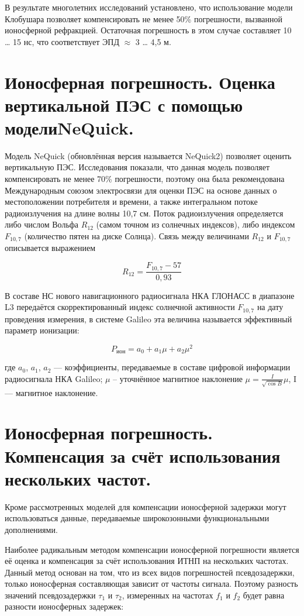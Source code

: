 \documentclass[14pt,a4paper,oneside]{extarticle}
\begin{document}
В результате многолетних исследований установлено, что использование модели Клобушара позволяет компенсировать не менее 50\% погрешности, вызванной ионосферной рефракцией. Остаточная погрешность в этом случае составляет 10 … 15 нс, что соответствует ЭПД $\approx$ 3 … 4,5 м.

\section{Ионосферная погрешность. Оценка вертикальной ПЭС с помощью моделиNeQuick.}

Модель NeQuick (обновлённая версия называется NeQuick2) позволяет оценить вертикальную ПЭС. Исследования показали, что данная модель позволяет компенсировать не менее 70\% погрешности, поэтому она была рекомендована Международным союзом электросвязи для оценки ПЭС на основе данных о местоположении потребителя и времени, а также интегральном потоке радиоизлучения на длине волны 10,7 см. Поток радиоизлучения определяется либо числом Вольфа $R_{12}$ (самом точном из солнечных индексов), либо индексом $F_{10,7}$ (количество пятен на диске Солнца). Связь между величинами $R_{12}$ и $F_{10,7}$ описывается выражением

\[R_{12}=\frac{F_{10,7}-57}{0,93}\]

В составе НС нового навигационного радиосигнала НКА ГЛОНАСС в диапазоне L3 передаётся скорректированный индекс солнечной активности $F_{10,7}$ на дату проведения измерения, в системе Galileo эта величина называется эффективный параметр ионизации:

\[P_{\text{ион}} = a _ 0 + a _ 1 \mu + a _ 2 \mu ^ 2\]

где $a_0$, $a_1$, $a_2$ –– коэффициенты, передаваемые в составе цифровой информации радиосигнала НКА Galileo; $\mu$ – уточнённое магнитное наклонение $\mu=\frac{I}{\sqrt{\cos B}}\mu $, I –– магнитное наклонение.

\section{Ионосферная погрешность. Компенсация за счёт использования нескольких частот.}

Кроме рассмотренных моделей для компенсации ионосферной задержки могут использоваться данные, передаваемые широкозонными функциональными дополнениями.

Наиболее радикальным методом компенсации ионосферной погрешности является её оценка и компенсация за счёт использования ИТНП на нескольких частотах. Данный метод основан на том, что из всех видов погрешностей псевдозадержки, только ионосферная составляющая зависит от частоты сигнала. Поэтому разность значений псевдозадержки $\tau_1$ и $\tau_2$, измеренных на частотах $f_1$ и $f_2$ будет равна разности ионосферных задержек:
\end{document}
